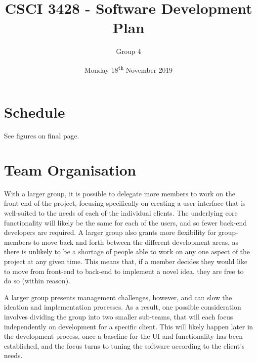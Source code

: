\documentclass[11pt]{article}
\renewcommand{\headrulewidth}{.3pt}
\renewcommand{\footrulewidth}{.3pt}
\begin{document}
\title{CSCI 3428 - Software Development Plan}
\author{Group 4}
\date{Monday 18\textsuperscript{th} November 2019}
\maketitle

\fancypagestyle{plain}{
\fancyhf{} %
\fancyfoot[r]{\footnotesize \thepage} %
\fancyfoot[l]{\small\scshape SDP} %
\renewcommand{\headrulewidth}{0pt}
\renewcommand{\footrulewidth}{.3pt}}

\section{Schedule}

See figures on final page.

\section{Team Organisation}
With a larger group, it is possible to delegate more members to work on the front-end of the project,
focusing specifically on creating a user-interface that is well-suited to the needs of each of the
individual clients. The underlying core functionality will likely be the same for each of the users,
and so fewer back-end developers are required. A larger group also grants more flexibility for
group-members to move back and forth between the different development areas, as there is unlikely
to be a shortage of people able to work on any one aspect of the project at any given time. This
means that, if a member decides they would like to move from front-end to back-end to implement a
novel idea, they are free to do so (within reason).

A larger group presents management challenges, however, and can slow the ideation and implementation
processes. As a result, one possible consideration involves dividing the group into two smaller
sub-teams, that will each focus independently on development for a specific client. This will likely
happen later in the development process, once a baseline for the UI and functionality has been
established, and the focus turns to tuning the software according to the client’s needs.
\end{document}
